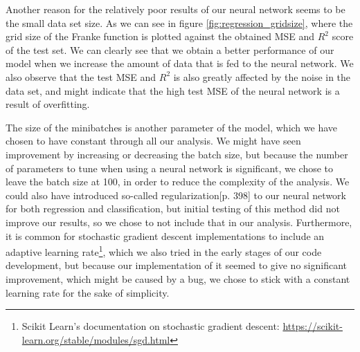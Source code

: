 Another reason for the relatively poor results of our neural network seems to be the small data set size.  As we can see in figure \ref{fig:regression_gridsize}, where the grid size of the Franke function is plotted against the obtained MSE and $R^2$ score of the test set. We can clearly see that we obtain a better performance of our model when we increase the amount of data that is fed to the neural network. We also observe that the test MSE and $R^2$ is also greatly affected by the noise in the data set, and might indicate that the high test MSE of the neural network is a result of overfitting.

The size of the minibatches is another parameter of the model, which we have chosen to have constant through all our analysis. We might have seen improvement by increasing or decreasing the batch size, but because the number of parameters to tune when using a neural network is significant, we chose to leave the batch size at 100, in order to reduce the complexity of the analysis. We could also have introduced so-called regularization\cite{hastie}[p. 398] to our neural network for both regression and classification, but initial testing of this method did not improve our results, so we chose to not include that in our analysis. Furthermore, it is common for stochastic gradient descent implementations to include an adaptive learning rate\footnote{Scikit Learn's documentation on stochastic gradient descent: \href{https://scikit-learn.org/stable/modules/sgd.html}{https://scikit-learn.org/stable/modules/sgd.html}}, which we also tried in the early stages of our code development, but because our implementation of it seemed to give no significant improvement, which might be caused by a bug, we chose to stick with a constant learning rate for the sake of simplicity.